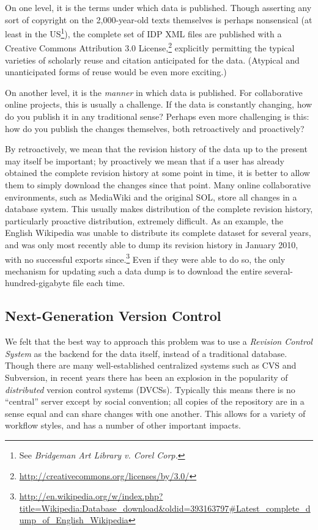 \documentclass[]{article}
\begin{document}
On one level, it is the terms under which data is published.
Though asserting any sort of copyright on the 2,000-year-old texts themselves is perhaps nonsensical (at least in the US\footnote{See \emph{Bridgeman Art Library v. Corel Corp.}}), the complete set of IDP XML files are published with a Creative Commons Attribution 3.0 License,\footnote{\url{http://creativecommons.org/licenses/by/3.0/}} explicitly permitting the typical varieties of scholarly reuse and citation anticipated for the data. (Atypical and unanticipated forms of reuse would be even more exciting.)

On another level, it is the \emph{manner} in which data is published. For collaborative online projects, this is usually a challenge. If the data is constantly changing, how do you publish it in any traditional sense? Perhaps even more challenging is this: how do you publish the changes themselves, both retroactively and proactively?

By retroactively, we mean that the revision history of the data up to the present may itself be important; by proactively we mean that if a user has already obtained the complete revision history at some point in time, it is better to allow them to simply download the changes since that point. Many online collaborative environments, such as MediaWiki and the original SOL, store all changes in a database system. This usually makes distribution of the complete revision history, particularly proactive distribution, extremely difficult. As an example, the English Wikipedia was unable to distribute its complete dataset for several years, and was only most recently able to dump its revision history in January 2010, with no successful exports since.\footnote{\url{http://en.wikipedia.org/w/index.php?title=Wikipedia:Database_download&oldid=393163797\#Latest_complete_dump_of_English_Wikipedia}} Even if they were able to do so, the only mechanism for updating such a data dump is to download the entire several-hundred-gigabyte file each time.

\subsection*{Next-Generation Version Control}

We felt that the best way to approach this problem was to use a \emph{Revision Control System} as the backend for the data itself, instead of a traditional database. Though there are many well-established centralized systems such as CVS and Subversion, in recent years there has been an explosion in the popularity of \emph{distributed} version control systems (DVCSs). Typically this means there is no “central” server except by social convention; all copies of the repository are in a sense equal and can share changes with one another. This allows for a variety of workflow styles, and has a number of other important impacts.
\end{document}
